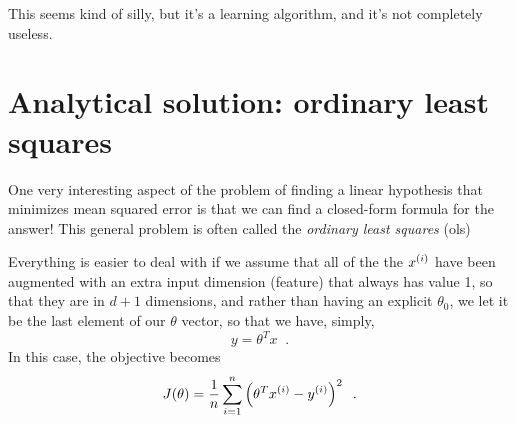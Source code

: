 This seems kind of silly, but it's a learning algorithm, and it's not
completely useless. 


\section{Analytical solution: ordinary least squares}

One very interesting aspect of the problem of finding a linear hypothesis
that minimizes mean squared error is that we can find a
closed-form formula for the answer! This general problem is often
called the {\em ordinary least squares} ({\sc ols})

Everything is easier to deal with if we assume that all of the the $x^{(i)}$
have been augmented with an extra input dimension (feature) that
always has value 1, so that they are in $d+1$ dimensions, and rather
than having an explicit $\theta_0$, we let it be the last element of
our $\theta$ vector, so that we have, simply,
\[y = \theta^T x\;\;.\]
In this case, the objective becomes
\begin{equation}
  J(\theta) = \frac{1}{n}\sum_{i =
    1}^n\left(\theta^Tx^{(i)} - y^{(i)}\right)^2 \;\;.
  \label{eq:reg_mse}
\end{equation}


